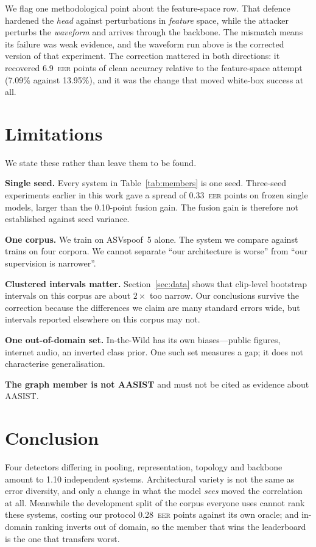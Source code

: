 \documentclass[11pt,a4paper]{article}
\newcommand{\eer}{\textsc{eer}}
\begin{document}
We flag one methodological point about the feature-space row. That defence hardened the \emph{head}
against perturbations in \emph{feature} space, while the attacker perturbs the \emph{waveform} and
arrives through the backbone. The mismatch means its failure was weak evidence, and the waveform run
above is the corrected version of that experiment. The correction mattered in both directions: it
recovered 6.9~\eer{} points of clean accuracy relative to the feature-space attempt (7.09\% against
13.95\%), and it was the change that moved white-box success at all.

\section{Limitations}

We state these rather than leave them to be found.

\textbf{Single seed.} Every system in Table~\ref{tab:members} is one seed. Three-seed experiments
earlier in this work gave a spread of 0.33~\eer{} points on frozen single models, larger than the
0.10-point fusion gain. The fusion gain is therefore not established against seed variance.

\textbf{One corpus.} We train on ASVspoof~5 alone. The system we compare against \citep{ustc2024}
trains on four corpora. We cannot separate ``our architecture is worse'' from ``our supervision is
narrower''.

\textbf{Clustered intervals matter.} Section~\ref{sec:data} shows that clip-level bootstrap
intervals on this corpus are about $2\times$ too narrow. Our conclusions survive the correction
because the differences we claim are many standard errors wide, but intervals reported elsewhere on
this corpus may not.

\textbf{One out-of-domain set.} In-the-Wild has its own biases---public figures, internet audio, an
inverted class prior. One such set measures a gap; it does not characterise generalisation.

\textbf{The graph member is not AASIST} and must not be cited as evidence about AASIST.

\section{Conclusion}

Four detectors differing in pooling, representation, topology and backbone amount to 1.10
independent systems. Architectural variety is not the same as error diversity, and only a change in
what the model \emph{sees} moved the correlation at all. Meanwhile the development split of the
corpus everyone uses cannot rank these systems, costing our protocol 0.28~\eer{} points against its
own oracle; and in-domain ranking inverts out of domain, so the member that wins the leaderboard is
the one that transfers worst.
\end{document}
